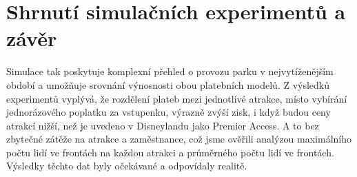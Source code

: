 \documentclass[a4paper,12pt]{article}
\begin{document}
\section{Shrnutí simulačních experimentů a závěr}
Simulace tak poskytuje komplexní přehled o provozu parku v nejvytíženějším období a umožňuje srovnání výnosnosti obou platebních modelů. Z výsledků experimentů vyplývá, že rozdělení plateb mezi jednotlivé atrakce, místo vybírání jednorázového poplatku za vstupenku, výrazně zvýší zisk, i když budou ceny atrakcí nižší, než je uvedeno v Disneylandu jako Premier Access. A to bez zbytečné zátěže na atrakce a zaměstnance, což jsme ověřili analýzou maximálního počtu lidí ve frontách na každou atrakci a průměrného počtu lidí ve frontách. Výsledky těchto dat byly očekávané a odpovídaly realitě.


 
\end{document}
